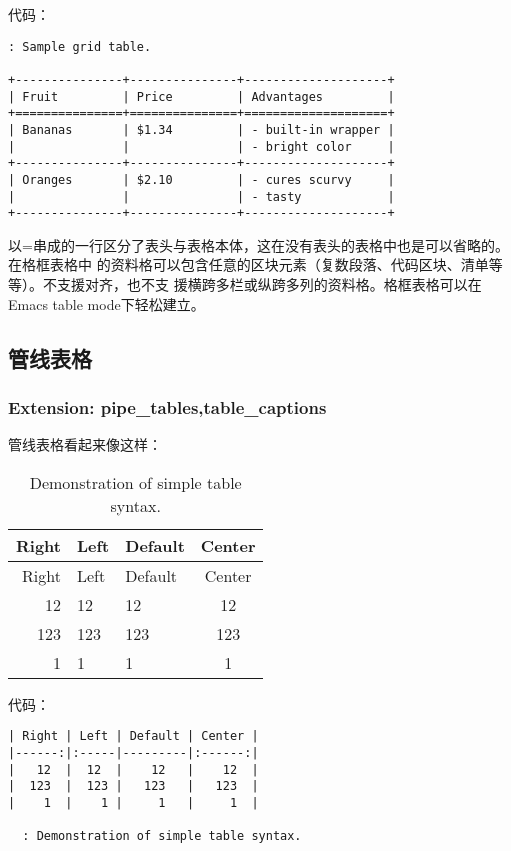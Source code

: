 \documentclass[fancyhdr,bookmark]{ctexbook}
\begin{document}
代码：

\begin{lstlisting}
: Sample grid table.

+---------------+---------------+--------------------+
| Fruit         | Price         | Advantages         |
+===============+===============+====================+
| Bananas       | $1.34         | - built-in wrapper |
|               |               | - bright color     |
+---------------+---------------+--------------------+
| Oranges       | $2.10         | - cures scurvy     |
|               |               | - tasty            |
+---------------+---------------+--------------------+
\end{lstlisting}

以=串成的一行区分了表头与表格本体，这在没有表头的表格中也是可以省略的。在格框表格中
的资料格可以包含任意的区块元素（复数段落、代码区块、清单等等）。不支援对齐，也不支
援横跨多栏或纵跨多列的资料格。格框表格可以在Emacs table mode下轻松建立。

\hypertarget{ux7ba1ux7ebfux8868ux683c}{%
\subsection{管线表格}\label{ux7ba1ux7ebfux8868ux683c}}

\hypertarget{extension-pipe_tablestable_captions}{%
\subsubsection{Extension:
pipe\_tables,table\_captions}\label{extension-pipe_tablestable_captions}}

管线表格看起来像这样：

\begin{longtable}[]{@{}rllc@{}}
\caption{Demonstration of simple table syntax.}\tabularnewline
\toprule
Right & Left & Default & Center\tabularnewline
\midrule
\endfirsthead
\toprule
Right & Left & Default & Center\tabularnewline
\midrule
\endhead
12 & 12 & 12 & 12\tabularnewline
123 & 123 & 123 & 123\tabularnewline
1 & 1 & 1 & 1\tabularnewline
\bottomrule
\end{longtable}

代码：

\begin{lstlisting}
| Right | Left | Default | Center |
|------:|:-----|---------|:------:|
|   12  |  12  |    12   |    12  |
|  123  |  123 |   123   |   123  |
|    1  |    1 |     1   |     1  |

  : Demonstration of simple table syntax.
\end{lstlisting}
\end{document}
